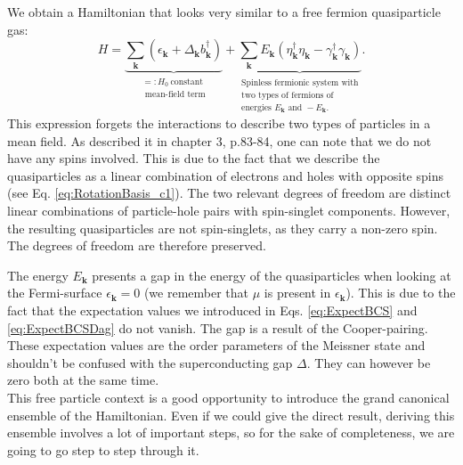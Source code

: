 \documentclass[../main.tex]{subfile}
\begin{document}
We obtain a Hamiltonian that looks very similar to a free fermion quasiparticle gas:
\begin{equation}\label{eq:HamiltonianBCS2}
H = \underbrace{\sum_{\bm{k}} \left(\epsilon_{\bm{k}} + \Delta_{\bm{k}} b_{\bm{k}}^{\dagger}\right)}_{\substack{=:H_0~ \text{constant}\\\text{ mean-field term}}}  
+ \underbrace{\sum_{\bm{k}} E_{\bm{k}}\left(\eta_{\bm{k}}^{\dagger}\eta_{\bm{k}} - 
\gamma_{\bm{k}}^{\dagger}\gamma_{\bm{k}}\right)}_{\substack{\text{Spinless fermionic system with} 
\\\text{two types of fermions of}\\\text{energies }E_{\bm{k}}\text{ and }-E_{\bm{k}}.}}.
\end{equation}
This expression forgets the interactions to describe two types of particles in a mean field. 
As \cite{FossheimSudbo2004} described it in chapter 3, p.83-84, one can note that we do not have any spins involved. This is due
to the fact that we describe the quasiparticles as a linear combination of electrons and holes with opposite spins (see Eq. \ref{eq:RotationBasis_c1}).
The two relevant degrees of freedom are distinct linear combinations of particle-hole 
pairs with spin-singlet components. However, the resulting quasiparticles are not spin-singlets, as they carry a non-zero spin.
The degrees of freedom are therefore preserved.

The energy $E_{\bm{k}}$ presents a gap in the energy of the quasiparticles when looking at the Fermi-surface $\epsilon_{\bm{k}}=0$ (we remember that $\mu$ is present in $\epsilon_{\bm{k}}$).
This is due to the fact that the expectation values we introduced in Eqs. \ref{eq:ExpectBCS} and \ref{eq:ExpectBCSDag} do not vanish. The gap is a result of the Cooper-pairing. These expectation values
are the order parameters of the Meissner state and shouldn't be confused with the superconducting gap $\Delta$. They can however be zero both at the same time. \\

This free particle context is a good opportunity to introduce the grand canonical ensemble of the Hamiltonian. 
Even if we could give the direct result, deriving this ensemble involves a lot of important steps, so for
the sake of completeness, we are going to go step to step through it.
\end{document}
